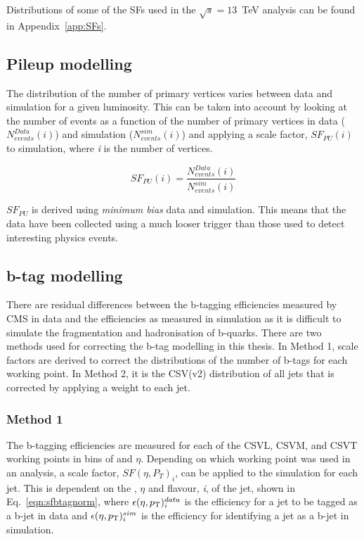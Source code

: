 Distributions of some of the SFs used in the $\sqrt{s}=13$~TeV analysis can be found in Appendix~\ref{app:SFs}.


\subsection{Pileup modelling}
\label{sec:pile-up}
The distribution of the number of primary vertices varies between data and simulation for a given luminosity. This can be taken into account by looking at the number of events as a function of the number of primary vertices in data (${N_{events}^{Data}(i)}$) and simulation (${N_{events}^{sim}(i)}$) and applying a scale factor, $SF_{PU}\left( i \right)$ to simulation, where \emph{i} is the number of vertices.

\begin{equation}
SF_{PU}\left( i \right) = \frac{N_{events}^{Data}(i)}{N_{events}^{sim}(i)} 
\label{eqn:PUSF}
\end{equation}

$SF_{PU}$ is derived using \emph{minimum bias} data and simulation. This means that the data have been collected using a much looser trigger than those used to detect interesting physics events. 

\subsection{b-tag modelling ~\label{sec:btagModelling}}
There are residual differences between the b-tagging efficiencies measured by CMS in data and the efficiencies as measured in simulation as it is difficult to simulate the fragmentation and hadronisation of b-quarks. There are two methods used for correcting the b-tag modelling in this thesis. In Method 1, scale factors are derived to correct the distributions of the number of b-tags for each working point. In Method 2, it is the CSV(v2) distribution of all jets that is corrected by applying a weight to each jet.

\subsubsection{Method 1 ~\label{subsec:method1btag}}

The b-tagging efficiencies are measured for each of the CSVL, CSVM, and CSVT working points in bins of \pt and $\eta$. Depending on which working point was used in an analysis, a scale factor, $SF(\eta, P_{T})_{i}$,  can be applied to the simulation for each jet. This is dependent on the \pt, $\eta$ and flavour, \emph{i}, of the jet, shown in Eq.~\ref{eqn:sfbtagnorm}, where $\epsilon(\eta , p_{\mathrm{T}})^{data}_{i}$ is the efficiency for a jet to be tagged as a b-jet in data and $\epsilon(\eta , p_{\mathrm{T}})^{sim}_{i}$ is the efficiency for identifying a jet as a b-jet in simulation.

